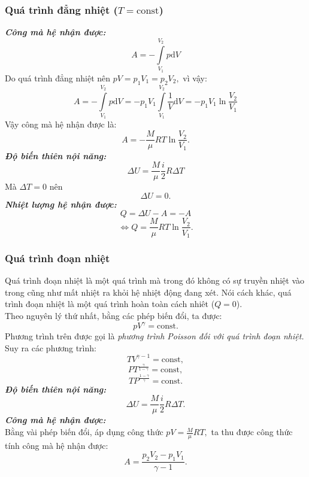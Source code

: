\subsubsection{Quá trình đẳng nhiệt ($T = \mathrm{const}$)}
\textbf{\textit{Công mà hệ nhận được:}}
$$A =  - \int\limits_{{V_1}}^{{V_2}} {p \mathrm{d} V} $$
Do quá trình đẳng nhiệt nên $pV = p_1 V_1 = p_2 V_2,$ vì vậy:
$$A =  - \int\limits_{{V_1}}^{{V_2}} {p\mathrm{d}V}  =  - {p_1}{V_1}\int\limits_{{V_1}}^{{V_2}} {\frac{1}{V}} \mathrm{d}V =  - {p_1}{V_1}\ln \frac{{{V_2}}}{{{V_1}}}$$
Vậy công mà hệ nhận được là:
$$A =  - \frac{M}{\mu }RT\ln \frac{{{V_2}}}{{{V_1}}}.$$
\textbf{\textit{Độ biến thiên nội năng:}}
$$ \Delta U = \frac{M}{\mu} \frac{i}{2} R \Delta T$$
Mà $\Delta T = 0$ nên
$$\Delta U = 0.$$
\textbf{\textit{Nhiệt lượng hệ nhận được:}}
$$Q = \Delta U - A = - A$$
$$\Leftrightarrow Q = \frac{M}{\mu }RT\ln \frac{{{V_2}}}{{{V_1}}}.$$
\subsubsection{Quá trình đoạn nhiệt}
Quá trình đoạn nhiệt là một quá trình mà trong đó không có sự truyền nhiệt vào trong cũng như mất nhiệt ra khỏi hệ nhiệt động đang xét. Nói cách khác, quá trình đoạn nhiệt là một quá trình hoàn toàn cách nhiêt ($Q = 0$).\\
Theo nguyên lý thứ nhất, bằng các phép biến đổi, ta được:
$$p V^\gamma = \mathrm{const}.$$
Phương trình trên được gọi là \textit{phương trình Poisson đối với quá trình đoạn nhiệt.}
Suy ra các phương trình:
$$TV^{\gamma - 1} =\mathrm{const},$$
$$PT^{\frac{\gamma}{1 - \gamma}} = \mathrm{const},$$
$$TP^{\frac{1 - \gamma}{\gamma}} = \mathrm{const}.$$
\textbf{\textit{Độ biến thiên nội năng:}}
$$ \Delta U = \frac{M}{\mu} \frac{i}{2} R \Delta T.$$
\textbf{\textit{Công mà hệ nhận được:}}\\
Bằng vài phép biến đổi, áp dụng công thức $pV = \frac{M}{\mu}RT,$ ta thu được công thức tính công mà hệ nhận được:
$$A = \frac{p_2 V_2 - p_1 V_1}{\gamma - 1}.$$